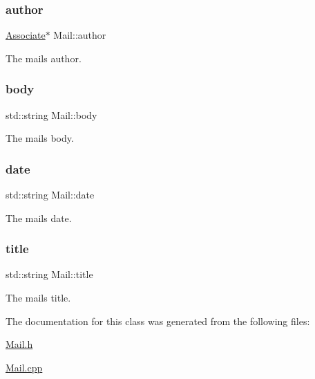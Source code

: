 \subsubsection{\texorpdfstring{author}{author}}
{\footnotesize\ttfamily \hyperlink{classAssociate}{Associate}$\ast$ Mail\+::author\hspace{0.3cm}{\ttfamily [private]}}



The mail\textquotesingle{}s author. 

\mbox{\label{classMail_aaa91a94ee92b2712218a9cae389554f7}} 
\subsubsection{\texorpdfstring{body}{body}}
{\footnotesize\ttfamily std\+::string Mail\+::body\hspace{0.3cm}{\ttfamily [private]}}



The mail\textquotesingle{}s body. 

\mbox{\label{classMail_aee9bc87682f6173b92bf135397f38162}} 
\subsubsection{\texorpdfstring{date}{date}}
{\footnotesize\ttfamily std\+::string Mail\+::date\hspace{0.3cm}{\ttfamily [private]}}



The mail\textquotesingle{}s date. 

\mbox{\label{classMail_a2f54f71a529dec6345d84ae60562b207}} 
\subsubsection{\texorpdfstring{title}{title}}
{\footnotesize\ttfamily std\+::string Mail\+::title\hspace{0.3cm}{\ttfamily [private]}}



The mail\textquotesingle{}s title. 



The documentation for this class was generated from the following files\+:\begin{DoxyCompactItemize}
\item 
\hyperlink{Mail_8h}{Mail.\+h}\item 
\hyperlink{Mail_8cpp}{Mail.\+cpp}\end{DoxyCompactItemize}
